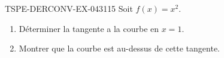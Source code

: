 \begin{exercice}{TSPE-DERCONV-EX-043}{1}{15}
Soit $f(x) = x^2$.
\begin{enumerate}
  \item Déterminer la tangente a la courbe en $x = 1$.
  \item Montrer que la courbe est au-dessus de cette tangente.
\end{enumerate}

\end{exercice}
